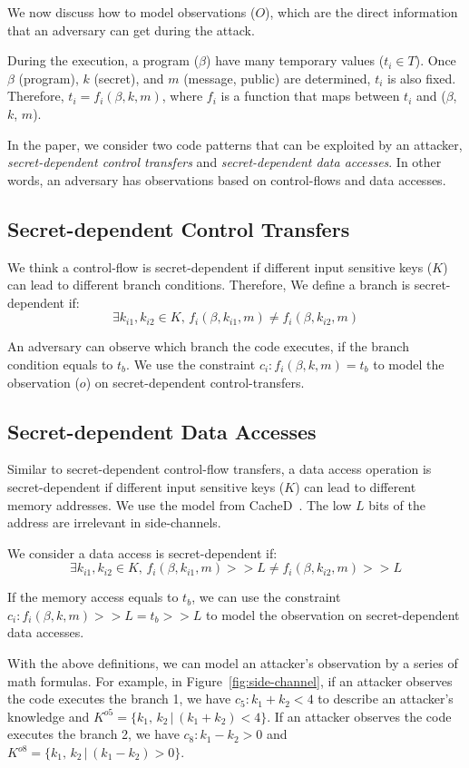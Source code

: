 We now discuss how to model observations ($O$), which are the direct information that an adversary can get during the attack.

During the execution, a program ($\beta$) have many temporary values ($t_i \in
T$). Once $\beta$ (program), $k$ (secret), and $m$ (message, public) are
determined, $t_i$ is also fixed. Therefore, $ t_i = f_i(\beta, k, m)$, where $f_
i$ is a function that maps between $t_i$ and ($\beta$, $k$, $m$).

In the paper, we consider two code patterns that can be exploited by an attacker,
\emph{secret-dependent control transfers} and \emph{secret-dependent data
accesses}. In other words, an adversary has observations based on control-flows
and data accesses.

\subsection{Secret-dependent Control Transfers}
We think a control-flow is secret-dependent if different input sensitive keys
($K$) can lead to different branch conditions. Therefore,
We define a branch is secret-dependent if:
$$\exists k_{i1}, k_{i2} \in K , \,f_i(\beta, k_{i1}, m) \neq f_i(\beta, k_{i2}, m)$$

An adversary can observe which branch the code executes, if the branch condition
equals to $t_b$. We use the constraint $c_i : f_i(\beta, k, m) = t_b$ to model
the observation ($o$) on secret-dependent control-transfers.

\subsection{Secret-dependent Data Accesses}
Similar to secret-dependent control-flow transfers, a data access operation is
secret-dependent if different input sensitive keys ($K$) can lead to different
memory addresses. We use the model from CacheD~\cite{203878}. The low $L$ bits
of the address are irrelevant in side-channels.

We consider a data access is secret-dependent if:
$$\exists k_{i1}, k_{i2} \in K, \,f_i(\beta, k_{i1}, m) >> L \neq f_i(\beta, k_{i2}, m) >> L$$

If the memory access equals to $t_b$, we can use the constraint $c_i :
f_i(\beta, k, m) >> L = t_b >> L$ to model the observation on secret-dependent
data accesses.

With the above definitions, we can model an attacker's observation by a series of math
formulas. For example, in Figure~\ref{fig:side-channel}, if an attacker observes
the code executes the branch 1, we have $c_5: k_1 + k_2 < 4$ to describe an
attacker's knowledge and $K^{o5} = \{k_1,\, k_2\,|\, (k_1 + k_2) < 4\}$. If an
attacker observes the code executes the branch 2, we have $c_8: k_1 - k_2 > 0$
and $K^{o8} = \{k_1,\, k_2\,|\, (k_1 - k_2) > 0\}$.
